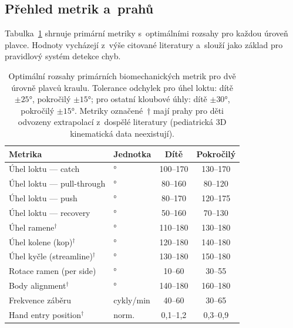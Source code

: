 \subsection{Přehled metrik a~prahů}

Tabulka~\ref{tab:metriky_prahy} shrnuje primární metriky s~optimálními rozsahy pro každou úroveň plavce. Hodnoty vycházejí z~výše citované literatury a~slouží jako základ pro pravidlový systém detekce chyb.

\begin{table}[htbp]
\centering
\caption{Optimální rozsahy primárních biomechanických metrik pro dvě úrovně plavců kraulu. Tolerance odchylek pro úhel loktu: dítě $\pm 25°$, pokročilý $\pm 15°$; pro ostatní kloubové úhly: dítě $\pm 30°$, pokročilý $\pm 15°$. Metriky označené~$\dagger$ mají prahy pro děti odvozeny extrapolací z~dospělé literatury (pediatrická 3D kinematická data neexistují).}
\label{tab:metriky_prahy}
\small
\begin{tabular}{llcc}
\toprule
\textbf{Metrika} & \textbf{Jednotka} & \textbf{Dítě} & \textbf{Pokročilý} \\
\midrule
Úhel loktu --- catch & $°$ & 100--170 & 130--170 \\
Úhel loktu --- pull-through & $°$ & 80--160 & 80--120 \\
Úhel loktu --- push & $°$ & 80--170 & 120--175 \\
Úhel loktu --- recovery & $°$ & 50--160 & 70--130 \\
Úhel ramene$^\dagger$ & $°$ & 110--180 & 130--180 \\
Úhel kolene (kop)$^\dagger$ & $°$ & 120--180 & 140--180 \\
Úhel kyčle (streamline)$^\dagger$ & $°$ & 130--180 & 150--180 \\
Rotace ramen (per side) & $°$ & 10--60 & 30--55 \\
Body alignment$^\dagger$ & $°$ & 140--180 & 160--180 \\
Frekvence záběru & cykly/min & 40--60 & 30--65 \\
Hand entry position$^\dagger$ & norm. & 0,1--1,2 & 0,3--0,9 \\
\bottomrule
\end{tabular}
\end{table}

